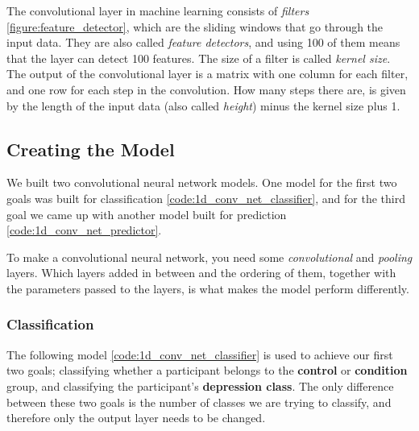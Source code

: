 The convolutional layer in machine learning consists of \textit{filters} \ref{figure:feature_detector}, which are the sliding windows that go through the input data.  They are also called \textit{feature detectors}, and using 100 of them means that the layer can detect 100 features. The size of a filter is called \textit{kernel size}. The output of the convolutional layer is a matrix with one column for each filter, and one row for each step in the convolution. How many steps there are, is given by the length of the input data (also called \textit{height}) minus the kernel size plus 1.

\subsection{Creating the Model}
We built two convolutional neural network models. One model for the first two goals was built for classification \ref{code:1d_conv_net_classifier}, and for the third goal we came up with another model built for prediction \ref{code:1d_conv_net_predictor}.

To make a convolutional neural network, you need some \textit{convolutional} and \textit{pooling} layers. Which layers added in between and the ordering of them, together with the parameters passed to the layers, is what makes the model perform differently. 

\subsubsection{Classification}
The following model \ref{code:1d_conv_net_classifier} is used to achieve our first two goals; classifying whether a participant belongs to the \textbf{control} or \textbf{condition} group, and classifying the participant's \textbf{depression class}. The only difference between these two goals is the number of classes we are trying to classify, and therefore only the output layer needs to be changed.

